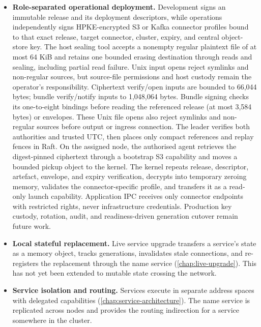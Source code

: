 \begin{itemize}
    \item \textbf{Role-separated operational deployment.} Development signs
        an immutable release and its deployment descriptors, while operations
        independently signs HPKE-encrypted S3 or Kafka connector profiles bound
        to that exact release, target connector, cluster, expiry, and central
        object-store key. The host sealing tool accepts a nonempty regular
        plaintext file of at most 64 KiB and retains one bounded erasing
        destination through reads and sealing, including partial read failure.
        Unix input opens reject symlinks and non-regular sources, but source-file
        permissions and host custody remain the operator's responsibility.
        Ciphertext verify/open inputs are bounded to 66,044 bytes; bundle
        verify/notify inputs to 1,048,064 bytes. Bundle signing checks its
        one-to-eight bindings before reading the referenced release (at most
        3,584 bytes) or envelopes. These Unix file opens also reject symlinks
        and non-regular sources before output or ingress connection.
        The leader verifies both authorities and trusted UTC,
        then places only compact references and replay fences in Raft. On the
        assigned node, the authorised agent retrieves the digest-pinned
        ciphertext through a bootstrap S3 capability and moves a bounded pickup
        object to the kernel. The kernel repeats release, descriptor, artefact,
        envelope, and expiry verification, decrypts into temporary zeroing
        memory, validates the connector-specific profile, and transfers it as a
        read-only launch capability. Application IPC receives only
        connector endpoints with restricted rights, never infrastructure credentials. Production key
        custody, rotation, audit, and readiness-driven generation cutover remain
        future work.

    \item \textbf{Local stateful replacement.} Live service upgrade
        transfers a service's state as a memory object, tracks generations,
        invalidates stale connections, and re-registers the replacement
        through the name service (\autoref{chap:live-upgrade}). This has not yet been
        extended to mutable state crossing the network.

    \item \textbf{Service isolation and routing.} Services execute in
        separate address spaces with delegated capabilities
        (\autoref{chap:service-architecture}).
        The name service is replicated across nodes and provides the routing
        indirection for a service somewhere in the cluster.


\end{itemize}
